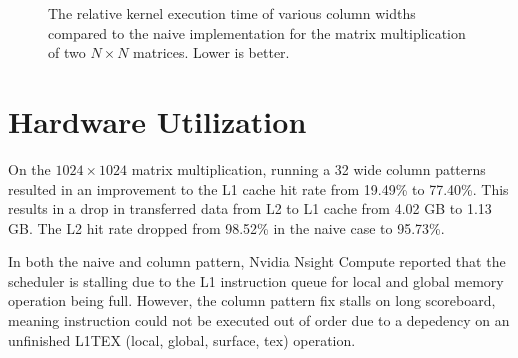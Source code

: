 \begin{figure}
    \centering
    \caption{
        The relative kernel execution time of various column widths compared to the naive implementation for the matrix multiplication of two $N \times N$ matrices. Lower is better.
    }
\end{figure}

\section{Hardware Utilization}
On the $1024 \times 1024$ matrix multiplication, running a 32 wide column patterns resulted in an improvement to the L1 cache hit rate from 19.49\% to 77.40\%.
This results in a drop in transferred data from L2 to L1 cache from 4.02 GB to 1.13 GB. 
The L2 hit rate dropped from 98.52\% in the naive case to 95.73\%.

In both the naive and column pattern, Nvidia Nsight Compute reported that the scheduler is stalling due to the L1 instruction queue for local and global memory operation being full.
However, the column pattern fix stalls on long scoreboard, meaning instruction could not be executed out of order due to a depedency on an unfinished L1TEX (local, global, surface, tex) operation.
